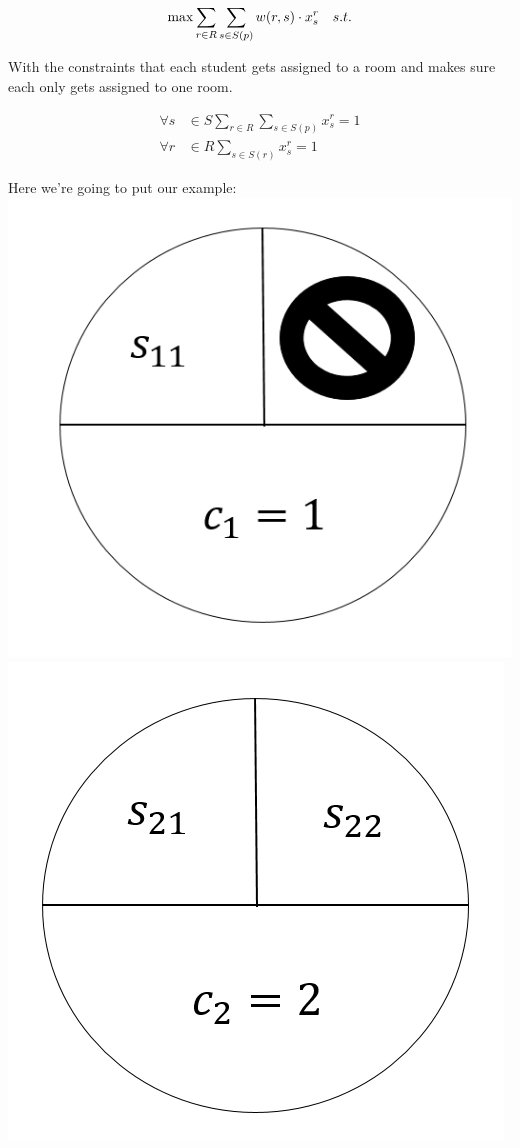 \documentclass[12pt]{article}
\begin{document}
\begin{equation*}
\max\sum_{r\in{R}}\sum_{s\in{S(p)}}w(r,s)\cdot{x_s^r}\quad{s.t.}\\
\end{equation*}

With the constraints that each student gets assigned to a room and makes sure each only gets assigned to one room.

\begin{align*}
\forall{s}&\in{S}\sum_{r\in{R}}\sum_{s\in{S(p)}}x_s^r=1\\
\forall{r}&\in{R}\sum_{s\in{S(r)}}x_s^r=1
\end{align*}

Here we're going to put our example:\\

\includegraphics[scale=0.25]{c1} %
\includegraphics[scale=0.25]{c2} %
\end{document}
